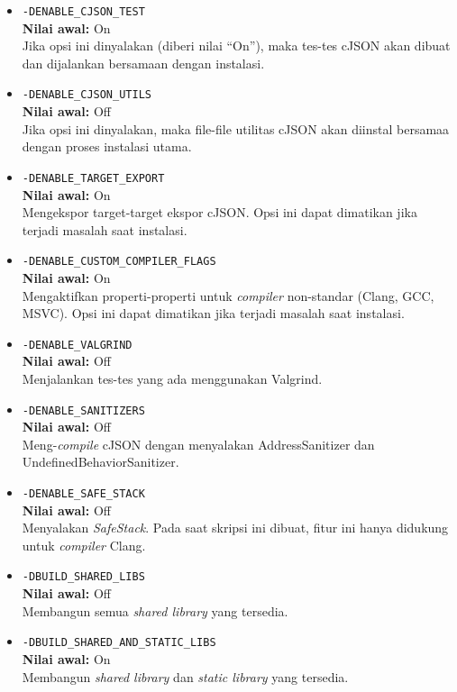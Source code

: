 \begin{itemize}[listparindent=\parindent]
	\begin{itemize}
		\item \verb|-DENABLE_CJSON_TEST|\\
		\textbf{Nilai awal:} On\\
		Jika opsi ini dinyalakan (diberi nilai ``On''), maka tes-tes cJSON akan dibuat dan dijalankan bersamaan dengan instalasi.
		\item \verb|-DENABLE_CJSON_UTILS|\\
		\textbf{Nilai awal:} Off\\
		Jika opsi ini dinyalakan, maka file-file utilitas cJSON akan diinstal bersamaa dengan proses instalasi utama.
		\item \verb|-DENABLE_TARGET_EXPORT|\\
		\textbf{Nilai awal:} On\\
		Mengekspor target-target ekspor cJSON. Opsi ini dapat dimatikan jika terjadi masalah saat instalasi.
		\item \verb|-DENABLE_CUSTOM_COMPILER_FLAGS|\\
		\textbf{Nilai awal:} On\\
		Mengaktifkan properti-properti untuk \textit{compiler} non-standar (Clang, GCC, MSVC). Opsi ini dapat dimatikan jika terjadi masalah saat instalasi.
		\item \verb|-DENABLE_VALGRIND|\\
		\textbf{Nilai awal:} Off\\
		Menjalankan tes-tes yang ada menggunakan \mbox{Valgrind}.
		\item \verb|-DENABLE_SANITIZERS|\\
		\textbf{Nilai awal:} Off\\
		Meng-\textit{compile} cJSON dengan menyalakan \mbox{AddressSanitizer} dan \mbox{UndefinedBehaviorSanitizer}.
		\item \verb|-DENABLE_SAFE_STACK|\\
		\textbf{Nilai awal:} Off\\
		Menyalakan \textit{SafeStack}. Pada saat skripsi ini dibuat, fitur ini hanya didukung untuk \textit{compiler} Clang.
		\item \verb|-DBUILD_SHARED_LIBS|\\
		\textbf{Nilai awal:} Off\\
		Membangun semua \textit{shared library} yang tersedia.
		\item \verb|-DBUILD_SHARED_AND_STATIC_LIBS|\\
		\textbf{Nilai awal:} On\\
		Membangun \textit{shared library} dan \textit{static library} yang tersedia.

\end{itemize}
\end{itemize}
